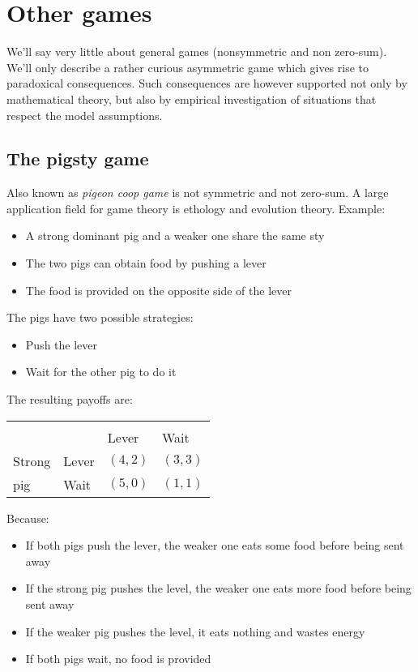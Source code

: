 \section{Other games}

We'll say very little about general games (nonsymmetric and non zero-sum). We'll only describe a rather curious asymmetric game which gives rise to paradoxical consequences. Such consequences are however supported not only by mathematical theory, but also by empirical investigation of situations that respect the model assumptions.

\subsection{The pigsty game}

Also known as \textit{pigeon coop game} is not symmetric and not zero-sum. A large application field for game theory is ethology and evolution theory. Example: 
\begin{itemize}
	\item A strong dominant pig and a weaker one share the same sty
	
	\item The two pigs can obtain food by pushing a lever
	
	\item The food is provided on the opposite side of the lever
\end{itemize}

The pigs have two possible strategies:
\begin{itemize}
	\item Push the lever
	
	\item Wait for the other pig to do it
\end{itemize}

The resulting payoffs are:
\begin{center}
	\renewcommand{\arraystretch}{1.2}
	\begin{tabular}{C{1.5cm} C{1.5cm} | C{1.5cm} C{1.5cm}}
		  \\
		& & Lever & Wait \\
		Strong & Lever & $(4,2)$ & $(3,3)$ \\
		pig & Wait & $(5,0)$ & $(1,1)$
	\end{tabular}
\end{center}

Because: 
\begin{itemize}
	\item If both pigs push the lever, the weaker one eats some food before being sent away
	
	\item If the strong pig pushes the level, the weaker one eats more food before being sent away
	
	\item If the weaker pig pushes the level, it eats nothing and wastes energy
	
	\item If both pigs wait, no food is provided
\end{itemize}


